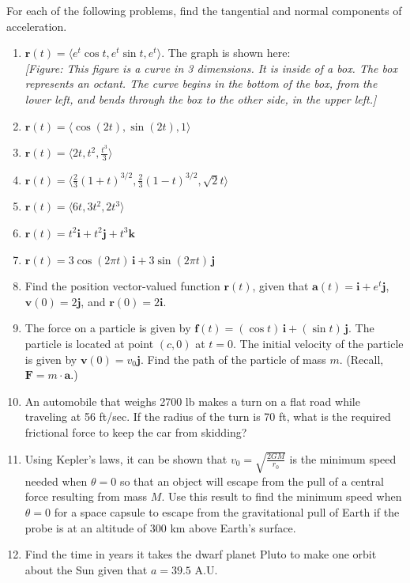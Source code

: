 \documentclass{exercises}
\begin{document}
For each of the following problems, find the tangential and normal components of acceleration.

\begin{enumerate}[resume]
\item $\mathbf{r}(t)=\langle e^{t}\cos t,e^{t}\sin t,e^{t}\rangle$. The graph is shown here: \\ \textit{[Figure: This figure is a curve in 3 dimensions. It is inside of a box. The box represents an octant. The curve begins in the bottom of the box, from the lower left, and bends through the box to the other side, in the upper left.]}
\item $\mathbf{r}(t)=\langle \cos(2t),\sin(2t),1\rangle$
\item $\mathbf{r}(t)=\langle2t,t^{2},\frac{t^{3}}{3}\rangle$
\item $\mathbf{r}(t)=\langle \frac{2}{3}{(1+t)}^{3/2},\frac{2}{3}{(1-t)}^{3/2},\sqrt{2}t\rangle$
\item $\mathbf{r}(t)=\langle6t,3t^{2},2t^{3}\rangle$
\item $\mathbf{r}(t)=t^{2}\mathbf{i}+t^{2}\mathbf{j}+t^{3}\mathbf{k}$
\item $\mathbf{r}(t)=3\cos(2\pi t)\,\mathbf{i}+3\sin(2\pi t)\,\mathbf{j}$
\item Find the position vector-valued function $\mathbf{r}(t)$, given that $\mathbf{a}(t)=\mathbf{i}+e^{t}\mathbf{j}$, $\mathbf{v}(0)=2\mathbf{j}$, and $\mathbf{r}(0)=2\mathbf{i}$.
\item The force on a particle is given by $\mathbf{f}(t)=(\cos t)\,\mathbf{i}+(\sin t)\,\mathbf{j}$. The particle is located at point $(c,0)$ at $t=0$. The initial velocity of the particle is given by $\mathbf{v}(0)=v_{0}\mathbf{j}$. Find the path of the particle of mass $m$. (Recall, $\mathbf{F}=m\cdot \mathbf{a}$.)
\item An automobile that weighs 2700 lb makes a turn on a flat road while traveling at 56 ft/sec. If the radius of the turn is 70 ft, what is the required frictional force to keep the car from skidding?
\item Using Kepler's laws, it can be shown that $v_{0}=\sqrt{\frac{2GM}{r_{0}}}$ is the minimum speed needed when $\theta=0$ so that an object will escape from the pull of a central force resulting from mass $M$. Use this result to find the minimum speed when $\theta=0$ for a space capsule to escape from the gravitational pull of Earth if the probe is at an altitude of 300 km above Earth's surface.
\item Find the time in years it takes the dwarf planet Pluto to make one orbit about the Sun given that $a=39.5$ A.U.
\end{enumerate}
\end{document}
